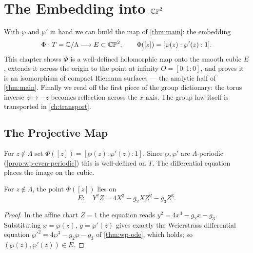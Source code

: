 \chapter{The Embedding into \texorpdfstring{$\mathbb{CP}^2$}{CP2}}
\label{ch:embedding}

With \(\wp\) and \(\wp'\) in hand we can build the map of \cref{thm:main}: the
embedding
\[
  \Phi : T = \mathbb{C}/\Lambda \longrightarrow E \subset \mathbb{CP}^2,
  \qquad \Phi([z]) = [\wp(z) : \wp'(z) : 1] .
\]
This chapter shows \(\Phi\) is a well-defined holomorphic map onto the smooth
cubic \(E\), extends it across the origin to the point at infinity \(O =
[0:1:0]\), and proves it is an isomorphism of compact Riemann surfaces --- the
analytic half of \cref{thm:main}. Finally we read off the first piece of the
group dictionary: the torus inverse \(z \mapsto -z\) becomes reflection across
the \(x\)-axis. The group law itself is transported in \cref{ch:transport}.

\section{The Projective Map}
\label{sec:emb-map}

For \(z \notin \Lambda\) set \(\Phi([z]) = [\wp(z) : \wp'(z) : 1]\). Since \(\wp,
\wp'\) are \(\Lambda\)-periodic (\cref{prop:wp-even-periodic}) this is
well-defined on \(T\). The differential equation places the image on the cubic.

\begin{proposition}
\label{prop:emb-lands}
For \(z \notin \Lambda\), the point \(\Phi([z])\) lies on
\[
  E : \quad Y^2 Z = 4 X^3 - g_2 X Z^2 - g_3 Z^3 .
\]
\end{proposition}

\begin{proof}
In the affine chart \(Z = 1\) the equation reads \(y^2 = 4x^3 - g_2 x - g_3\).
Substituting \(x = \wp(z)\), \(y = \wp'(z)\) gives exactly the Weierstrass
differential equation \(\wp'^2 = 4\wp^3 - g_2\wp - g_3\) of \cref{thm:wp-ode},
which holds; so \((\wp(z), \wp'(z)) \in E\).
\end{proof}

